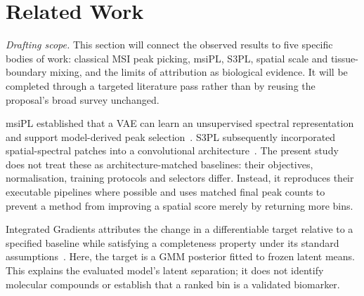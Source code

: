 \section{Related Work}
\label{sec:related_work}

\emph{Drafting scope.} This section will connect the observed results to five
specific bodies of work: classical MSI peak picking, msiPL, S3PL, spatial scale
and tissue-boundary mixing, and the limits of attribution as biological
evidence. It will be completed through a targeted literature pass rather than
by reusing the proposal's broad survey unchanged.

msiPL established that a VAE can learn an unsupervised spectral representation
and support model-derived peak selection~\citep{abdelmoula2021peak}. S3PL
subsequently incorporated spatial-spectral patches into a convolutional
architecture~\citep{weigand2026spatial}. The present study does not treat these
as architecture-matched baselines: their objectives, normalisation, training
protocols and selectors differ. Instead, it reproduces their executable
pipelines where possible and uses matched final peak counts to prevent a method
from improving a spatial score merely by returning more bins.

Integrated Gradients attributes the change in a differentiable target relative
to a specified baseline while satisfying a completeness property under its
standard assumptions~\citep{sundararajan2017axiomatic}. Here, the target is a
GMM posterior fitted to frozen latent means. This explains the evaluated model's
latent separation; it does not identify molecular compounds or establish that a
ranked bin is a validated biomarker.

